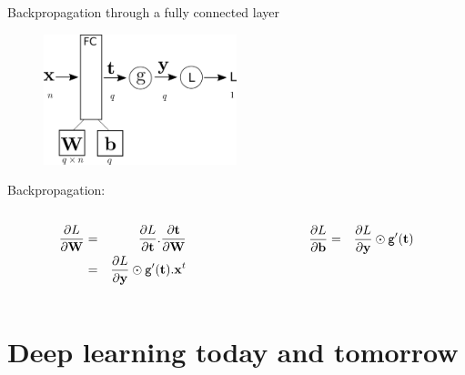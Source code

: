 \documentclass[xcolor=pdftex,dvipsnames,table,mathserif]{beamer}
\begin{document}
\begin{frame}{Backpropagation through a fully connected layer}
  \begin{figure}
    \includegraphics[width=0.5\textwidth]{../graphics/bp_fc.png}
  \end{figure}

  Backpropagation:
  \begin{columns}
    \begin{column}{.5\textwidth}
      \begin{eqnarray*}
        \pdv{L}{\mathbf{W}} &=& \pdv{L}{\mathbf{t}}.\pdv{\mathbf{t}}{\mathbf{W}} \\
                   &=& \pdv{L}{\mathbf{y}} \odot \texttt{g}'(\mathbf{t}).\mathbf{x}^t
      \end{eqnarray*}
    \end{column}

  \begin{column}{.5\textwidth}
  \begin{eqnarray*}
    \pdv{L}{\mathbf{b}} &=&  \pdv{L}{\mathbf{y}} \odot \texttt{g}'(\mathbf{t})
  \end{eqnarray*}
  \end{column}
\end{columns}


\end{frame}

\section{Deep learning today and tomorrow}



\end{document}
